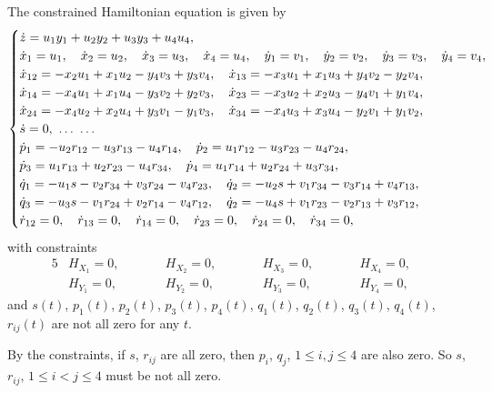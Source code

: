 \documentclass[pdftex]{sigma}
\numberwithin{equation}{section}
\theoremstyle{definition}
\newcommand{\0}{\boldsymbol{0}}
\begin{document}
The constrained Hamiltonian equation is given by
\begin{gather}
\begin{cases}
\dot{z} = u_1y_1 + u_2y_2 + u_3y_3 + u_4u_4,
\\
\dot{x}_1 = u_1, \quad \dot{x}_2 = u_2, \quad \dot{x}_3 = u_3, \quad \dot{x}_4 = u_4, \quad
\dot{y}_1 = v_1, \quad \dot{y}_2 = v_2, \quad \dot{y}_3 = v_3, \quad \dot{y}_4 = v_4,
\\
\dot{x}_{12} = - x_2u_1 + x_1u_2 - y_4v_3 + y_3v_4, \quad
\dot{x}_{13} = - x_3u_1 + x_1u_3 + y_4v_2 - y_2v_4,
\\
\dot{x}_{14} = - x_4u_1 + x_1u_4 - y_3v_2 + y_2v_3, \quad
\dot{x}_{23} = - x_3u_2 + x_2u_3 - y_4v_1 + y_1v_4,
\\
\dot{x}_{24} = - x_4u_2 + x_2u_4 + y_3v_1 - y_1v_3, \quad
\dot{x}_{34} = - x_4u_3 + x_3u_4 - y_2v_1 + y_1v_2,
\\
\dot{s} = 0, \ \dots \ \dots
\\
\dot{p}_1 = - u_2r_{12} - u_3r_{13} - u_4r_{14}, \quad \dot{p}_2 = u_1r_{12} - u_3r_{23} - u_4r_{24},
\\
\dot{p}_3 = u_1r_{13} + u_2r_{23} - u_4r_{34}, \quad \dot{p}_4 = u_1r_{14} + u_2r_{24} + u_3r_{34},
\\
\dot{q}_1 = - u_1s - v_2r_{34} + v_3r_{24} - v_4r_{23}, \quad \dot{q}_2 = - u_2s + v_1r_{34} - v_3r_{14} + v_4r_{13},
\\
\dot{q}_3 = - u_3s - v_1r_{24} + v_2r_{14} - v_4r_{12}, \quad \dot{q}_2 = - u_4s + v_1r_{23} - v_2r_{13} + v_3r_{12},
\\
\dot{r}_{12} = 0, \quad \dot{r}_{13} = 0, \quad \dot{r}_{14} = 0, \quad \dot{r}_{23} = 0, \quad \dot{r}_{24} = 0, \quad \dot{r}_{34} = 0,
\end{cases}\hspace{-10mm}
 \label{sharp}
\end{gather}
with constraints
\begin{alignat*}{5}
&H_{X_1} = 0, \qquad&& H_{X_2} = 0, \qquad&& H_{X_3} = 0, \qquad&& H_{X_4} = 0,& \\
&H_{Y_1} = 0, \qquad&& H_{Y_2} = 0, \qquad&& H_{Y_3} = 0, \qquad&& H_{Y_4} = 0,&
\end{alignat*}
and $s(t)$, $p_1(t)$, $p_2(t)$, $p_3(t)$, $p_4(t)$, $q_1(t)$, $q_2(t)$, $q_3(t)$, $q_4(t)$, $r_{ij}(t)$ are not all zero for any $t$.

By the constraints, if $s$, $r_{ij}$ are all zero, then $p_i$, $q_j$, $1 \leq i, j \leq 4$ are also zero.
So $s$, $r_{ij}$, $1 \leq i < j \leq 4$ must be not all zero.
\end{document}
